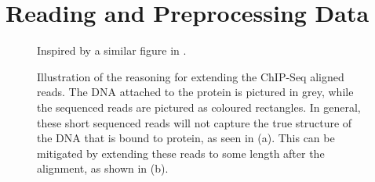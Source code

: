\documentclass[parskip]{cs4rep}
\begin{document}
\section{Reading and Preprocessing Data}
\label{sec:reading_and_preprocessing}

\begin{figure}
   \centering
   {Inspired by a similar figure in \cite{Park:2009wc}.} 
   \caption{Illustration of the reasoning for extending the ChIP-Seq aligned reads. The DNA attached to the protein is pictured in grey, while the sequenced reads are pictured as coloured rectangles. In general, these short sequenced reads will not capture the true structure of the DNA that is bound to protein, as seen in (a). This can be mitigated by extending these reads to some length after the alignment, as shown in (b).}
    \label{fig:methods:reading:shifts}
\end{figure}
\end{document}
